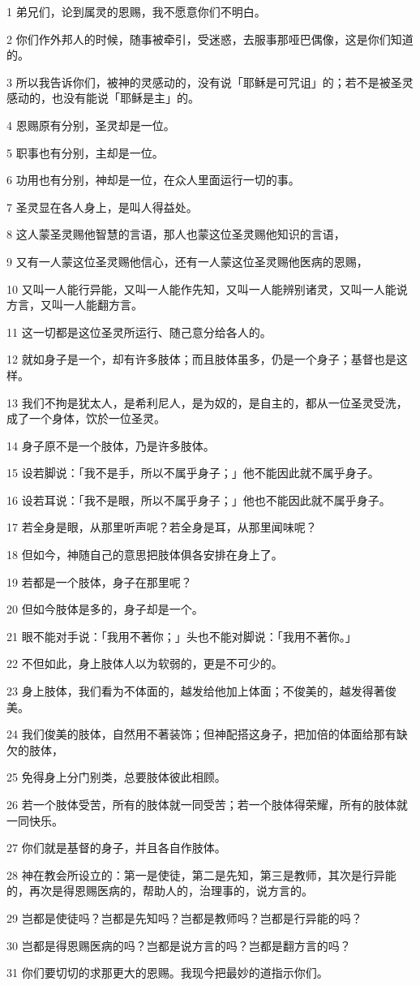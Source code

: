 \par 1 弟兄们，论到属灵的恩赐，我不愿意你们不明白。
\par 2 你们作外邦人的时候，随事被牵引，受迷惑，去服事那哑巴偶像，这是你们知道的。
\par 3 所以我告诉你们，被神的灵感动的，没有说「耶稣是可咒诅」的；若不是被圣灵感动的，也没有能说「耶稣是主」的。
\par 4 恩赐原有分别，圣灵却是一位。
\par 5 职事也有分别，主却是一位。
\par 6 功用也有分别，神却是一位，在众人里面运行一切的事。
\par 7 圣灵显在各人身上，是叫人得益处。
\par 8 这人蒙圣灵赐他智慧的言语，那人也蒙这位圣灵赐他知识的言语，
\par 9 又有一人蒙这位圣灵赐他信心，还有一人蒙这位圣灵赐他医病的恩赐，
\par 10 又叫一人能行异能，又叫一人能作先知，又叫一人能辨别诸灵，又叫一人能说方言，又叫一人能翻方言。
\par 11 这一切都是这位圣灵所运行、随己意分给各人的。
\par 12 就如身子是一个，却有许多肢体；而且肢体虽多，仍是一个身子；基督也是这样。
\par 13 我们不拘是犹太人，是希利尼人，是为奴的，是自主的，都从一位圣灵受洗，成了一个身体，饮於一位圣灵。
\par 14 身子原不是一个肢体，乃是许多肢体。
\par 15 设若脚说：「我不是手，所以不属乎身子；」他不能因此就不属乎身子。
\par 16 设若耳说：「我不是眼，所以不属乎身子；」他也不能因此就不属乎身子。
\par 17 若全身是眼，从那里听声呢？若全身是耳，从那里闻味呢？
\par 18 但如今，神随自己的意思把肢体俱各安排在身上了。
\par 19 若都是一个肢体，身子在那里呢？
\par 20 但如今肢体是多的，身子却是一个。
\par 21 眼不能对手说：「我用不著你；」头也不能对脚说：「我用不著你。」
\par 22 不但如此，身上肢体人以为软弱的，更是不可少的。
\par 23 身上肢体，我们看为不体面的，越发给他加上体面；不俊美的，越发得著俊美。
\par 24 我们俊美的肢体，自然用不著装饰；但神配搭这身子，把加倍的体面给那有缺欠的肢体，
\par 25 免得身上分门别类，总要肢体彼此相顾。
\par 26 若一个肢体受苦，所有的肢体就一同受苦；若一个肢体得荣耀，所有的肢体就一同快乐。
\par 27 你们就是基督的身子，并且各自作肢体。
\par 28 神在教会所设立的：第一是使徒，第二是先知，第三是教师，其次是行异能的，再次是得恩赐医病的，帮助人的，治理事的，说方言的。
\par 29 岂都是使徒吗？岂都是先知吗？岂都是教师吗？岂都是行异能的吗？
\par 30 岂都是得恩赐医病的吗？岂都是说方言的吗？岂都是翻方言的吗？
\par 31 你们要切切的求那更大的恩赐。我现今把最妙的道指示你们。

